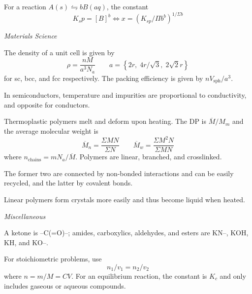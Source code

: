 \documentclass[10pt]{extarticle}
\begin{document}
\begin{multicols*}{2}
\bigskip
For a reaction $A(s) \leftrightharpoons bB(aq)$, the constant
\begin{equation}
  K_sp = [B]^b \iff x = (K_{sp}/\Pi b^b)^{1/\Sigma b}
\end{equation}


\bigskip
{\large\textit{Materials Science}}
\bigskip

The density of a unit cell is given by
\begin{equation}
  \rho = \frac{nM}{a^3 N_a} \qquad a = \left\{ 2r, \; 4r/\sqrt 3, \; 2 \sqrt 2 r  \right\}
\end{equation}
for sc, bcc, and fcc respectively. The packing efficiency is given by $n V_{\text{sph}} / a^3$.

\bigskip
In semiconductors, temperature and impurities are proportional to conductivity, and opposite for conductors.

\bigskip
Thermoplastic polymers melt and deform upon heating. The DP is $\overline M / M_{m}$ and the average molecular weight is
\begin{equation}
  \overline M_n = \frac{\Sigma MN}{\Sigma N} \qquad \overline M_w = \frac{\Sigma M^2 N}{\Sigma MN}
\end{equation}
where $n_\text{chains} = m N_a / \overline M$. Polymers are linear, branched, and crosslinked.

\bigskip
The former two are connected by non-bonded interactions and can be easily recycled, and the latter by covalent bonds.

\bigskip
Linear polymers form crystals more easily and thus become liquid when heated.


\vspace{7mm}
{\large\textit{Miscellaneous}}
\bigskip

A ketone is --C(=O)--; amides, carboxylics, aldehydes, and esters are KN--, KOH, KH, and KO--.

\bigskip
For stoichiometric problems, use
\begin{equation}
  n_1/v_1 = n_2/v_2
\end{equation}
where $n = m/M = CV$. For an equilibrium reaction, the constant is $K_c$ and only includes gaseous or aqueous compounds.


\end{multicols*}
\end{document}

